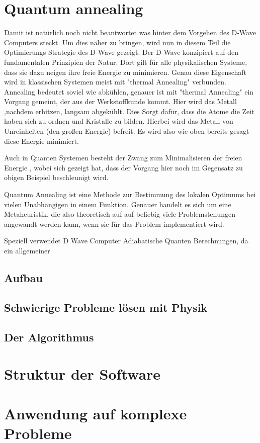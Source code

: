 \documentclass{article}
\begin{document}
\section{Quantum annealing}\label{sec:baseAlgo}
Damit ist natürlich noch nicht beantwortet was hinter dem Vorgehen des D-Wave Computers steckt.
Um dies näher zu bringen, wird nun in diesem Teil 
die Optimierungs Strategie des D-Wave gezeigt.
Der D-Wave konzipiert auf den fundamentalen Prinzipien der Natur. Dort gilt für alle physikalischen Systeme, dass sie dazu neigen ihre freie Energie zu minimieren. Genau diese Eigenschaft wird in klassischen 
Systemen meist mit "thermal Annealing" verbunden.
Annealing bedeutet soviel wie abkühlen, genauer ist mit "thermal Annealing" ein Vorgang gemeint, der aus der Werkstoffkunde kommt. Hier wird das Metall ,nachdem  erhitzen, langsam abgekühlt. Dies Sorgt dafür, dass die Atome die Zeit haben sich zu ordnen und Kristalle zu bilden.%
Hierbei wird das Metall von Unreinheiten (den großen Energie) befreit.
Es wird also wie oben bereits gesagt diese Energie minimiert.

Auch in Quanten Systemen besteht der Zwang zum Minimalisieren der freien Energie , wobei sich gezeigt hat, dass der Vorgang hier noch 
im Gegensatz zu obigen Beispiel beschleunigt wird.

Quantum Annealing ist eine Methode zur Bestimmung des lokalen Optimums bei vielen Unabhängigen in einem Funktion. Genauer handelt es sich um eine Metaheuristik, die also theoretisch auf auf beliebig viele Problemstellungen angewandt werden kann, wenn sie für das Problem implementiert wird.

Speziell verwendet D Wave Computer Adiabatische Quanten Berechnungen,
da ein allgemeiner 
 




\subsection{Aufbau}\label{sec:funktion}\cite{ref:one}

\subsection{Schwierige Probleme lösen mit Physik}\label{sec:historyAlgo}
\subsection{Der Algorithmus}\label{sec:algo}
\section{Struktur der Software}\label{sec:software}
\section{Anwendung auf komplexe Probleme}\label{sec:problems}

\cleardoublepage


\end{document}
